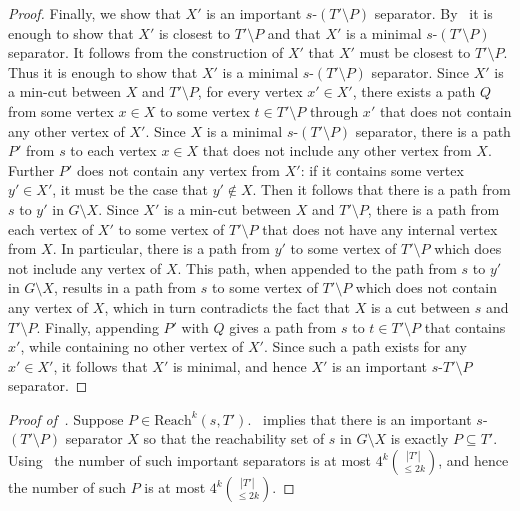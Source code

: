\documentclass[11pt]{article}
\newcommand{\Reach}{\mathrm{Reach}\xspace}
\begin{document}
{\begin{proof}
Finally, we show that $X'$ is an important $s$-$(T' \setminus P)$ separator. By~ it is enough to show that $X'$ is closest to $T' \setminus P$ and that $X'$ is a minimal $s$-$(T' \setminus P)$ separator. It follows from the construction of $X'$ that $X'$ must be closest to $T' \setminus P$. Thus it is enough to show that $X'$ is a minimal $s$-$(T' \setminus P)$ separator. Since $X'$ is a min-cut between $X$ and $T' \setminus P$, for every vertex $x' \in X'$, there exists a path $Q$ from some vertex $x \in X$ to some vertex $t \in T' \setminus P$ through $x'$ that does not contain any other vertex of $X'$. Since $X$ is a minimal $s$-$(T'\setminus P)$ separator, there is a path $P'$ from $s$ to each vertex $x \in X$ that does not include any other vertex from $X$. Further $P'$ does not contain any vertex from $X'$: if it contains some vertex $y' \in X'$, it must be the case that $y' \notin X$. Then it follows that there is a path from $s$ to $y'$ in $G \setminus X$. Since $X'$ is a min-cut between $X$ and $T' \setminus P$, there is a path from each vertex of $X'$ to some vertex of $T'\setminus P$ that does not have any internal vertex from $X$.   
In particular, there is a path from $y'$ to some vertex of $T' \setminus P$ which does not include any vertex of $X$. This path,  when appended to the path from $s$ to $y'$ in $G \setminus X$, results in a path from $s$ to some vertex of $T' \setminus P$ which does not contain any vertex of $X$, which in turn contradicts the fact that $X$ is a cut between $s$ and $T' \setminus P$. Finally, appending $P'$ with $Q$ gives a path from $s$ to $t \in T' \setminus P$ that contains $x'$, while containing no other vertex of $X'$. Since such a path exists for any $x' \in X'$, it follows that $X'$ is minimal, and hence $X'$ is an important $s$-$T' \setminus P$ separator.
\end{proof}
}

\begin{proof}[Proof of~]
Suppose $P \in \Reach^k(s,T')$.~ implies that there is an important $s$-$(T'\setminus P)$ separator $X$ so that the reachability set of $s$ in $G \setminus X$ is exactly $P \subseteq T'$. Using~ the number of such important separators is at most $4^k{|T'| \choose \leq 2k}$, and hence the number of such $P$ is at most $4^k{|T'| \choose \leq 2k}$.
\end{proof}
\end{document}
